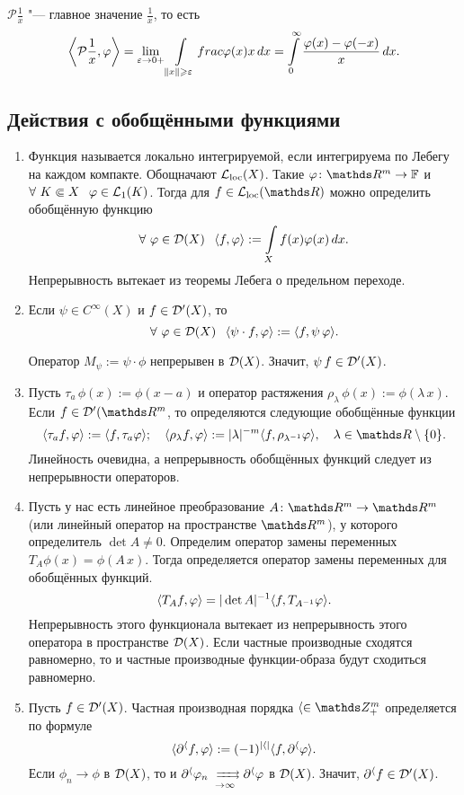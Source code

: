 \begin{Exa}
$\mathcal P\frac1x$ "--- главное значение $\frac1x$, то есть
\[
  \left\langle\mathcal P\frac1x,\varphi\right\rangle = 
  \lim\limits_{\varepsilon\rightarrow0+}\int\limits_{\|x\|\geqslant\varepsilon}\\frac{\varphi(x)}x\,dx = 
  \int\limits_0^\infty\frac{\varphi(x)-\varphi(-x)}x\,dx.
\]
\end{Exa}


\subsection{Действия с обобщёнными функциями}
\begin{enumerate} \item
Функция называется локально интегрируемой, если интегрируема по Лебегу на каждом компакте. Обощначают $\mathcal L_{\mathrm{loc}}(X)$. Такие $\phi\colon \R^m\to\F$ и $\forall\ K\Subset X\pau \phi\in\L_1(K)$. Тогда для $f\in \Lloc(\R)$ можно определить обобщённую функцию
\[
  \forall\ \phi\in\D(X)\pau \la f,\phi\ra:=\Gint{X} f(x)\phi(x)\,dx.
\]
Непрерывность вытекает из теоремы Лебега о предельном переходе.

\item Если $\psi\in C^\infty(X)$ и $f\in\mathcal D'(X)$, то
\[
  \forall\ \varphi\in \mathcal D(X)\hskip .75em plus.1em minus.08em\relax \langle\psi\cdot f,\varphi\rangle:=\langle f,\psi\,\varphi\rangle.
\]

Оператор $M_\psi:=\psi\cdot\phi$ непрерывен в $\mathcal D(X)$. Значит, $\psi\,f\in\mathcal D'(X)$.

\item Пусть $\tau_a\,\phi(x):=\phi(x-a)$ и  оператор растяжения $\rho_\lambda\,\phi(x):=\phi(\lambda\, x)$. Если $f\in\D'(\R^m$, то определяются следующие обобщённые функции 
\[
\la\tau_a f,\phi\ra:=\la f,\tau_a\phi\ra;\quad
 \la\rho_\l f,\phi\ra:=|\lambda|^{-m}\la f,\rho_{\l^{-1}}\phi\ra,\quad\l\in\R\dd\{0\}.
\]
Линейность очевидна, а непрерывность обобщённых функций следует из непрерывности операторов.
\item Пусть у нас есть линейное преобразование $A\colon \R^m\to\R^m$ (или линейный оператор на пространстве $\R^m$), у которого определитель $\det A\ne0$. Определим оператор замены переменных $T_A\phi(x) = \phi(A\,x)$. Тогда определяется оператор замены переменных для обобщённых функций.
\[
  \langle T_Af,\varphi\rangle = |\det A|^{-1}\langle f,T_{A^{-1}}\varphi\rangle.
\]
Непрерывность этого функционала вытекает из непрерывность этого оператора в пространстве $\mathcal D(X)$. Если частные производные сходятся равномерно, то и частные производные функции-образа будут сходиться равномерно.

\item Пусть $f\in\mathcal D'(X)$. Частная производная порядка $\a\in\Z_+^m$ определяется по формуле
\[
  \langle\partial^\langle f,\varphi\rangle:=(-1)^{|\langle|}\langle f,\partial^\langle\varphi\rangle.
\]
Если $\phi_n\to\phi$ в $\mathcal D(X)$, то и $\dl^\a\phi_n\rsh[ ]{ }\dl^\a\phi$ в $\mathcal D(X)$. Значит, $\partial^\langle f\in\mathcal D'(X)$.
\end{enumerate}
